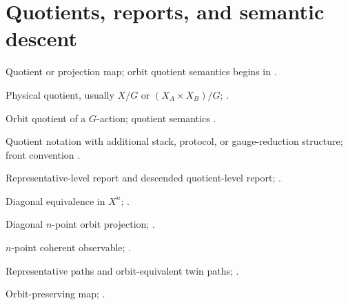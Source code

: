 \section*{Quotients, reports, and semantic descent}
\begin{description}[leftmargin=4.1cm,style=nextline,itemsep=0.2em,before=\raggedright]
\item[\(\pi\)]
Quotient or projection map; orbit quotient semantics begins in
.
\item[\(\Phys\)]
Physical quotient, usually \(X/G\) or \((X_A\times X_B)/G\);
.
\item[\(X/G\)]
Orbit quotient of a \(G\)-action; quotient semantics
.
\item[\(X\sslash G\)]
Quotient notation with additional stack, protocol, or gauge-reduction
structure; front convention .
\item[\(R,\widetilde R\)]
Representative-level report and descended quotient-level report;
.
\item[\(\sim_\Delta\)]
Diagonal equivalence in \(X^n\); .
\item[\(\pi_n:X^n\to X^n/G\)]
Diagonal \(n\)-point orbit projection; .
\item[\(R^{(n)}\)]
\(n\)-point coherent observable; .
\item[\(\Gamma,\widetilde\Gamma\)]
Representative paths and orbit-equivalent twin paths; .
\item[\(\Theta_X\)]
Orbit-preserving map; .
\end{description}

